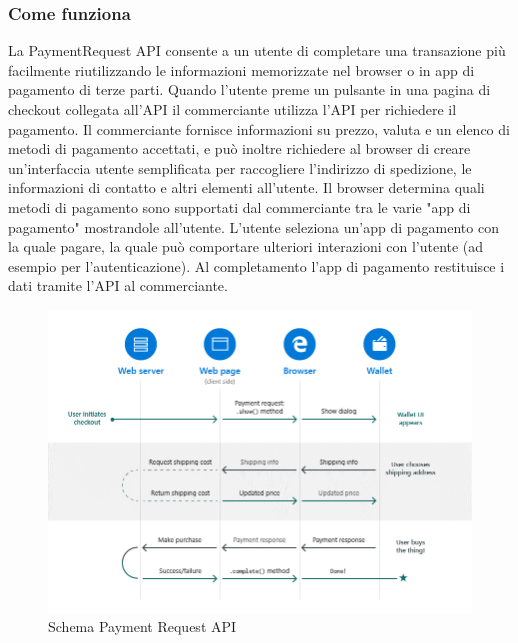 \documentclass[11pt ,a4paper , twoside , openright ]{article}
\begin{document}
\subsubsection{Come funziona}	
La PaymentRequest API consente a un utente di completare una transazione più facilmente riutilizzando le informazioni memorizzate nel browser o in app di pagamento di terze parti.
Quando l'utente preme un pulsante in una pagina di checkout collegata all'API il commerciante utilizza l'API per richiedere il pagamento. Il commerciante fornisce informazioni su prezzo, valuta e un elenco di metodi di pagamento accettati, e può inoltre richiedere al browser di creare un'interfaccia utente semplificata per raccogliere l'indirizzo di spedizione, le informazioni di contatto e altri elementi all'utente.
Il browser determina quali metodi di pagamento sono supportati dal commerciante tra le varie "app di pagamento" mostrandole all'utente. 
L'utente seleziona un'app di pagamento con la quale pagare, la quale può comportare ulteriori interazioni con l'utente (ad esempio per l'autenticazione). 
Al completamento l'app di pagamento restituisce i dati tramite l'API al commerciante.

\begin{figure}[h]
	\centering
	\includegraphics[width=1\linewidth]{SchemaPayment}
	\caption{Schema Payment Request API \cite{rif17}}
	\label{fig:Schema Payment}
\end{figure}
\pagebreak
\end{document}
